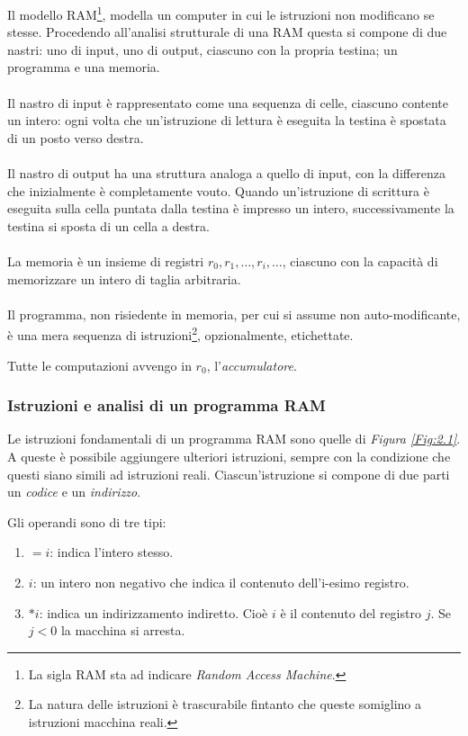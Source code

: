 \documentclass{subfiles}
\begin{document}
Il modello RAM\footnote[2]{La sigla RAM sta ad indicare \emph{Random Access Machine}.}, modella un computer in cui le istruzioni non modificano se stesse.
Procedendo all'analisi strutturale di una RAM questa si compone di due nastri: uno di input, uno di output, ciascuno con la propria testina; un programma e una memoria.
\\ \\
Il nastro di input è rappresentato come una sequenza di celle, ciascuno contente un intero:
ogni volta che un'istruzione di lettura è eseguita la testina è spostata di un posto verso destra.
\\ \\
Il nastro di output ha una struttura analoga a quello di input, con la differenza che inizialmente è completamente vouto.
Quando un'istruzione di scrittura è eseguita sulla cella puntata dalla testina è impresso un intero, successivamente la testina si sposta di un cella a destra.
\\ \\
La memoria è un insieme di registri \(r_{0}, r_{1}, \ldots, r_{i}, \ldots\), ciascuno con la capacità di memorizzare un intero di taglia arbitraria.
\\ \\
Il programma, non risiedente in memoria, per cui si assume non auto-modificante, è una mera sequenza di istruzioni\footnote[3]{La natura delle istruzioni è trascurabile fintanto che queste somiglino a istruzioni macchina reali.}, opzionalmente, etichettate.

\begin{Note*}
    Tutte le computazioni avvengo in \(r_{0}\), l'\emph{accumulatore}.
\end{Note*}
\clearpage

\subsubsection{Istruzioni e analisi di un programma RAM}
Le istruzioni fondamentali di un programma RAM sono quelle di \emph{Figura \ref{Fig:2.1}}. A queste è possibile aggiungere ulteriori istruzioni,
sempre con la condizione che questi siano simili ad istruzioni reali. Ciascun'istruzione si compone di due parti un \emph{codice} e un \emph{indirizzo}.



Gli operandi sono di tre tipi:
\begin{enumerate}
    \item \(=i\): indica l'intero stesso.
    \item \(i\): un intero non negativo che indica il contenuto dell'i-esimo registro.
    \item \(*i\): indica un indirizzamento indiretto. Cioè \(i\) è il contenuto del registro \(j\). Se \(j < 0\) la macchina si arresta.
\end{enumerate}
\end{document}
